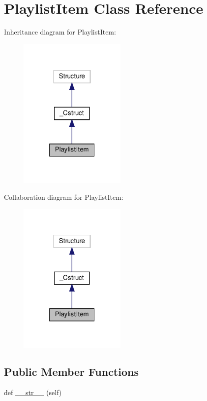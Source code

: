 \hypertarget{classvlc_1_1_playlist_item}{}\section{Playlist\+Item Class Reference}
\label{classvlc_1_1_playlist_item}


Inheritance diagram for Playlist\+Item\+:
\nopagebreak
\begin{figure}[H]
\begin{center}
\leavevmode
\includegraphics[width=148pt]{classvlc_1_1_playlist_item__inherit__graph}
\end{center}
\end{figure}


Collaboration diagram for Playlist\+Item\+:
\nopagebreak
\begin{figure}[H]
\begin{center}
\leavevmode
\includegraphics[width=148pt]{classvlc_1_1_playlist_item__coll__graph}
\end{center}
\end{figure}
\subsection*{Public Member Functions}
\begin{DoxyCompactItemize}
\item 
def \hyperlink{classvlc_1_1_playlist_item_a23e8041ce1015febe4fdace3225714f9}{\+\_\+\+\_\+str\+\_\+\+\_\+} (self)
\end{DoxyCompactItemize}


